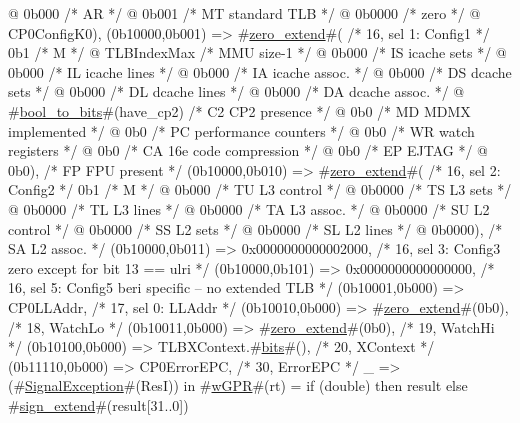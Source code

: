 {{                                 @ 0b000             /* AR */
                                 @ 0b001             /* MT standard TLB */
                                 @ 0b0000            /* zero */
                                 @ CP0ConfigK0),
          (0b10000,0b001) => #\hyperref[zzzerozyextend]{zero\_extend}#( /* 16, sel 1: Config1 */
                                          0b1      /* M */
                                        @ TLBIndexMax /* MMU size-1 */
                                        @ 0b000    /* IS icache sets */
                                        @ 0b000    /* IL icache lines */
                                        @ 0b000    /* IA icache assoc. */
                                        @ 0b000    /* DS dcache sets */
                                        @ 0b000    /* DL dcache lines */
                                        @ 0b000    /* DA dcache assoc. */
                                        @ #\hyperref[zboolzytozybits]{bool\_to\_bits}#(have_cp2) /* C2 CP2 presence */
                                        @ 0b0      /* MD MDMX implemented */
                                        @ 0b0      /* PC performance counters */
                                        @ 0b0      /* WR watch registers */
                                        @ 0b0      /* CA 16e code compression */
                                        @ 0b0      /* EP EJTAG */
                                        @ 0b0),     /* FP FPU present */
          (0b10000,0b010) => #\hyperref[zzzerozyextend]{zero\_extend}#( /* 16, sel 2: Config2 */
                                          0b1     /* M */
                                        @ 0b000   /* TU L3 control  */
                                        @ 0b0000  /* TS L3 sets */
                                        @ 0b0000  /* TL L3 lines */
                                        @ 0b0000  /* TA L3 assoc. */
                                        @ 0b0000  /* SU L2 control */
                                        @ 0b0000  /* SS L2 sets */
                                        @ 0b0000  /* SL L2 lines */
                                        @ 0b0000), /* SA L2 assoc. */
          (0b10000,0b011) => 0x0000000000002000, /* 16, sel 3: Config3 zero except for bit 13 == ulri */
          (0b10000,0b101) => 0x0000000000000000, /* 16, sel 5: Config5 beri specific -- no extended TLB */
          (0b10001,0b000) => CP0LLAddr,        /* 17, sel 0: LLAddr */
          (0b10010,0b000) => #\hyperref[zzzerozyextend]{zero\_extend}#(0b0),        /* 18, WatchLo */
          (0b10011,0b000) => #\hyperref[zzzerozyextend]{zero\_extend}#(0b0),        /* 19, WatchHi */
          (0b10100,0b000) => TLBXContext.#\hyperref[zbits]{bits}#(), /* 20, XContext */
          (0b11110,0b000) => CP0ErrorEPC,      /* 30, ErrorEPC */
          _               => (#\hyperref[zSignalException]{SignalException}#(ResI))
        } in
  #\hyperref[zwGPR]{wGPR}#(rt) = if (double) then result else #\hyperref[zsignzyextend]{sign\_extend}#(result[31..0])
}
